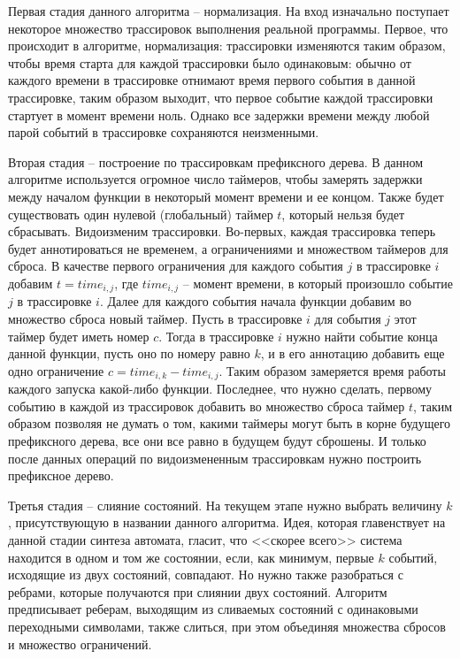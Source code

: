 \documentclass[times,specification,annotation]{itmo-student-thesis}
\begin{document}
Первая стадия данного алгоритма -- нормализация. На вход изначально поступает некоторое множество трассировок выполнения реальной программы. Первое, что происходит в алгоритме, нормализация:
трассировки изменяются таким образом, чтобы время старта для каждой трассировки было одинаковым: обычно от каждого времени в трассировке отнимают время первого события
в данной трассировке, таким образом выходит, что первое событие каждой трассировки стартует в момент времени ноль. Однако все задержки времени между любой парой событий в трассировке
сохраняются неизменными. 

Вторая стадия -- построение по трассировкам префиксного дерева. В данном алгоритме используется огромное число таймеров, чтобы замерять задержки между началом функции в некоторый
момент времени и ее концом. Также будет существовать один нулевой (глобальный) таймер $t$, который нельзя будет сбрасывать. Видоизменим трассировки. 
Во-первых, каждая трассировка теперь будет аннотироваться не временем, а ограничениями и множеством таймеров для сброса. В качестве первого ограничения для каждого события $j$ в трассировке $i$
добавим $t = time_{i, j}$, где $time_{i, j}$ -- момент времени, в который произошло событие $j$ в трассировке $i$. Далее для каждого события начала функции добавим во множество сброса новый
таймер. Пусть в трассировке $i$ для события $j$ этот таймер будет иметь номер $c$. Тогда в трассировке $i$ нужно найти событие конца данной функции, пусть оно по номеру равно $k$, и в его
аннотацию добавить еще одно ограничение $c = time_{i, k} - time_{i, j}$. Таким образом замеряется время работы каждого запуска какой-либо функции. Последнее, что нужно сделать,
первому событию в каждой из трассировок добавить во множество сброса таймер $t$, таким образом позволяя не думать о том, какими таймеры могут быть в корне будущего префиксного дерева, все они все равно
в будущем будут сброшены. И только после данных операций по видоизмененным трассировкам нужно построить префиксное дерево.

Третья стадия -- слияние состояний. На текущем этапе нужно выбрать величину $k$, присутствующую в названии данного алгоритма. Идея, которая главенствует на данной стадии синтеза автомата,
гласит, что <<скорее всего>> система находится в одном и том же состоянии, если, как минимум, первые $k$ событий, исходящие из двух состояний, совпадают. Но нужно также разобраться с ребрами, которые
получаются при слиянии двух состояний. Алгоритм предписывает реберам, выходящим из сливаемых состояний с одинаковыми переходными символами, также слиться, при этом объединяя множества сбросов и
множество ограничений. 
\end{document}
